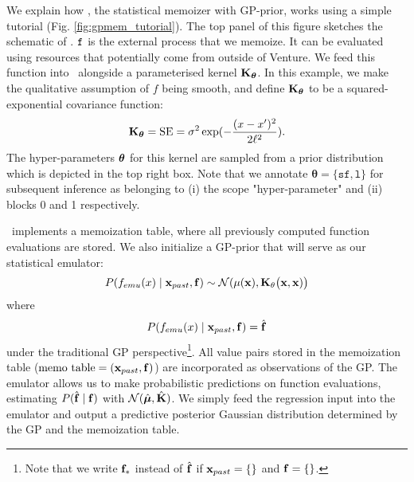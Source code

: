 We explain how \gpmem, the statistical memoizer with \ac{GP}-prior, works using a simple tutorial
(Fig. \ref{fig:gpmem_tutorial}). 
The top panel of this figure sketches the schematic of \gpmem.
$\texttt{f}$ is the external process that we memoize. It can be evaluated using resources that potentially come
from outside of Venture.  
We feed this function into \gpmem\ alongside
a parameterised kernel $\mathbf{K}_{\bm{\theta}}$.  
In this example, we make the qualitative assumption of $f$ being smooth, and define
$\mathbf{K}_{\bm{\theta}}$ to be a squared-exponential covariance function:
\[
\mathbf{K}_{\bm{\theta}} = \text{SE} = \sigma^2 \exp(-\frac{(x-x^\prime)^2}{2\ell^2}).
\]
The hyper-parameters $\bm{\theta}$ for this kernel are sampled from a 
prior distribution which is depicted in the top right box.
Note that we annotate $\bm{\theta}=\{\texttt{sf},\texttt{l}\}$ for subsequent
inference as belonging to (i) the scope "hyper-parameter" and (ii) blocks 0 and 1 respectively.

\gpmem\ implements a memoization table, where all previously
computed function evaluations are stored. We also initialize a \ac{GP}-prior that
will serve as our statistical emulator:
\[
P(f_{emu}(x) \mid \mathbf{x}_{past},\mathbf{f})\sim \mathcal{N}(\mu(\mathbf{x}),\mathbf{K}_\theta\big(\mathbf{x},\mathbf{x})\big)
\]
where 
\[
P(f_{emu}(x) \mid \mathbf{x}_{past},\mathbf{f}) = \hat{\mathbf{f}} 
\]
under the traditional \ac{GP} perspective\footnote{Note that we write $\mathbf{f}_*$ instead of $\hat{\mathbf{f}}$ if $\mathbf{x}_{past}=\{\}$ and $\mathbf{f}=\{\}$.}.
All value pairs stored in the memoization table ($\text{memo table} = (\mathbf{x}_{past},\mathbf{f})$) are incorporated as observations of
the \ac{GP}.
The emulator allows us to make probabilistic predictions on function evaluations, estimating
$P(\hat{\mathbf{f}}\mid \mathbf{f})$ with $\mathcal{N}(\hat{\bm{\mu}},\hat{\mathbf{K}})$.
We simply feed the regression input
into the emulator and output a predictive posterior Gaussian distribution determined by the \ac{GP} and
the memoization table.

